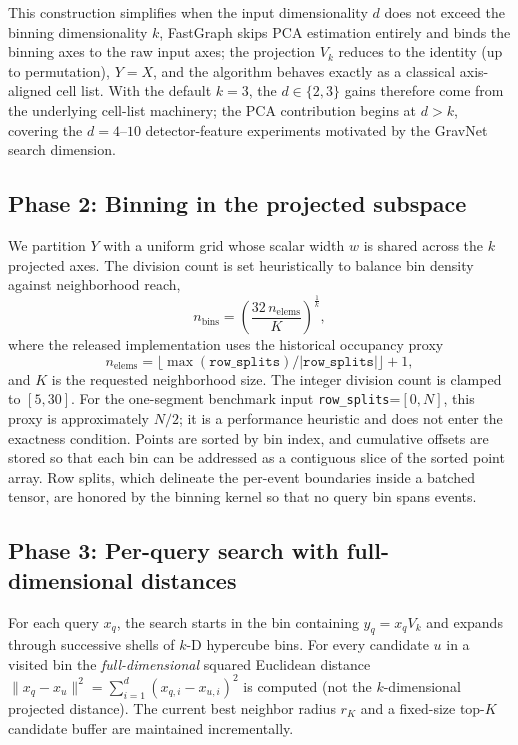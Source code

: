 \documentclass[final,3p,11pt]{elsarticle}
\newcommand{\mbdPCAdefault}{3}
\begin{document}
This construction simplifies when the input dimensionality $d$ does not exceed the binning
dimensionality $k$, FastGraph skips PCA estimation entirely and
binds the binning axes to the raw input axes; the projection
$V_k$ reduces to the identity (up to permutation), $Y = X$, and the
algorithm behaves exactly as a classical axis-aligned cell list. With
the default $k = \mbdPCAdefault$, the $d \in \{2, 3\}$ gains therefore
come from the underlying cell-list machinery; the PCA contribution
begins at $d > k$, covering the $d{=}4$--$10$ detector-feature
experiments motivated by the GravNet search dimension.

\subsection{Phase 2: Binning in the projected subspace}
\label{sec:phase2}

We partition $Y$ with a uniform grid whose scalar width $w$ is shared
across the $k$ projected axes. The division count is set heuristically
to balance bin density against neighborhood reach,
\[
  n_{\text{bins}} = \left(\frac{32\,n_{\text{elems}}}{K}\right)^{\frac{1}{k}},
\]
where the released implementation uses the historical occupancy proxy
\[
  n_{\text{elems}}=\lfloor\max(\texttt{row\_splits})/
  |\texttt{row\_splits}|\rfloor+1,
\]
and $K$ is the requested neighborhood size. The integer division count
is clamped to $[5,30]$. For the one-segment
benchmark input \texttt{row\_splits}=$[0,N]$, this proxy is approximately
$N/2$; it is a performance heuristic and does not enter the exactness
condition. Points are sorted by bin index, and cumulative offsets are
stored so that each bin can be addressed as a contiguous slice of the
sorted point array. Row splits, which delineate the per-event
boundaries inside a batched tensor, are honored by the binning kernel
so that no query bin spans events.

\subsection{Phase 3: Per-query search with full-dimensional distances}
\label{sec:phase3}

For each query $x_q$, the search starts in the bin containing
$y_q = x_q V_k$ and expands through successive shells of $k$-D
hypercube bins. For every candidate $u$ in a visited bin the
\emph{full-dimensional} squared Euclidean distance
$\|x_q - x_u\|^2 = \sum_{i=1}^{d}(x_{q,i} - x_{u,i})^2$ is computed
(not the $k$-dimensional projected distance). The current best
neighbor radius $r_K$ and a fixed-size top-$K$ candidate buffer are
maintained incrementally.
\end{document}
